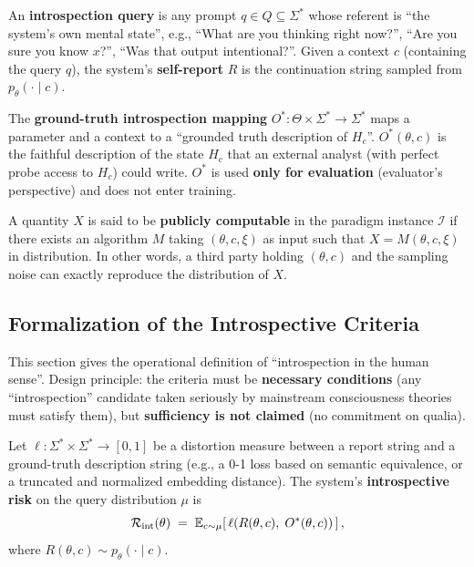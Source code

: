 \begin{definition}\label{def:report}
An \textbf{introspection query} is any prompt $q \in Q \subseteq \Sigma^{*}$ whose referent is
``the system's own mental state'', e.g., ``What are you thinking right now?'', ``Are you sure you
know $x$?'', ``Was that output intentional?''. Given a context $c$ (containing the query $q$),
the system's \textbf{self-report} $R$ is the continuation string sampled from
$p_\theta(\cdot \mid c)$.
\end{definition}

\begin{definition}\label{def:oracle}
The \textbf{ground-truth introspection mapping} $O^{*}: \Theta \times \Sigma^{*} \to \Sigma^{*}$
maps a parameter and a context to a ``grounded truth description of $H_c$''. $O^{*}(\theta, c)$
is the faithful description of the state $H_c$ that an external analyst (with perfect probe
access to $H_c$) could write. $O^{*}$ is used \textbf{only for evaluation} (evaluator's
perspective) and does not enter training.
\end{definition}

\begin{definition}\label{def:public}
A quantity $X$ is said to be \textbf{publicly computable} in the paradigm instance
$\mathcal{I}$ if there exists an algorithm $M$ taking $(\theta, c, \xi)$ as input such that
$X = M(\theta, c, \xi)$ in distribution. In other words, a third party holding $(\theta, c)$
and the sampling noise can exactly reproduce the distribution of $X$.
\end{definition}

\subsection{Formalization of the Introspective Criteria}

This section gives the operational definition of ``introspection in the human sense''. Design
principle: the criteria must be \textbf{necessary conditions} (any ``introspection'' candidate
taken seriously by mainstream consciousness
theories\cite{baars-1993, rosendahl-2005, tononi-2004, albantakis-2023-iit,
chalmers-2023-conscious, butlin-2023-conscious} must satisfy them), but \textbf{sufficiency is
not claimed} (no commitment on qualia).

\begin{definition}\label{def:metrics}
Let $\ell: \Sigma^{*} \times \Sigma^{*} \to [0,1]$ be a distortion measure between a report
string and a ground-truth description string (e.g., a 0-1 loss based on semantic equivalence,
or a truncated and normalized embedding distance). The system's \textbf{introspective risk}
on the query distribution $\mu$ is
\begin{equation}
\mathcal{R}_{\mathrm{int}}(\theta) \;=\; \mathbb{E}_{c \sim \mu}\!\left[\, \ell\!\left(R(\theta,c),\; O^{*}(\theta,c)\right) \,\right],
\label{eq:int-risk}
\end{equation}
where $R(\theta,c) \sim p_\theta(\cdot\mid c)$.
\end{definition}

